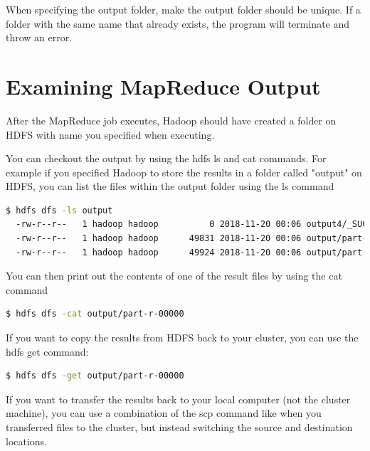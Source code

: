 \documentclass{article}
\begin{document}
\begin{info}
When specifying the output folder, make the output folder should be unique. If a folder with the same name that already exists, the program will terminate and throw an error. 
\end{info}



\section{Examining MapReduce Output}
After the MapReduce job executes, Hadoop should have created a folder on HDFS with name you specified when executing. 

You can checkout the output by using the hdfs ls and cat commands.
For example if you specified Hadoop to store the results in a folder called "output" on HDFS, you can list the files within the output folder using the ls command
\begin{lstlisting}[language=bash]
  $ hdfs dfs -ls output
  -rw-r--r--   1 hadoop hadoop          0 2018-11-20 00:06 output4/_SUCCESS
  -rw-r--r--   1 hadoop hadoop      49831 2018-11-20 00:06 output/part-r-00000
  -rw-r--r--   1 hadoop hadoop      49924 2018-11-20 00:06 output/part-r-00001
\end{lstlisting}
You can then print out the contents of one of the result files by using the cat command
\begin{lstlisting}[language=bash]
  $ hdfs dfs -cat output/part-r-00000
\end{lstlisting}
If you want to copy the results from HDFS back to your cluster, you can use the hdfs get command:
 \begin{lstlisting}[language=bash]
  $ hdfs dfs -get output/part-r-00000
\end{lstlisting} 
If you want to transfer the results back to your local computer (not the cluster machine), you can use a combination of the scp command like when you transferred files to the cluster, but instead switching the source and destination locations.

\end{document}

